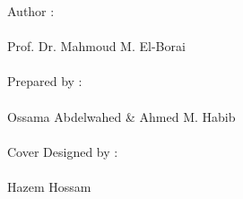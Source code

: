 \vspace*{.5cm}
{\fontsize{15pt}{0} \Garamondfont \selectfont
}

\par
\begin{figure}[b]
    \begin{minipage}[h]{\textwidth}
        {\fontsize{20pt}{0}
            \color{cover} Author : \\\\
            \color{white} \fancyfont Prof. Dr. Mahmoud M. El-Borai
            \\ \\ 
            \color{cover}Prepared by :\\\\
            \color{white} \fancyfont Ossama Abdelwahed \& Ahmed M. Habib
            \\ \\
            \color{cover} Cover Designed by :\\\\
            \color{white} \fancyfont Hazem Hossam
        }
    \end{minipage}
\end{figure}
\restoregeometry
\endgroup
